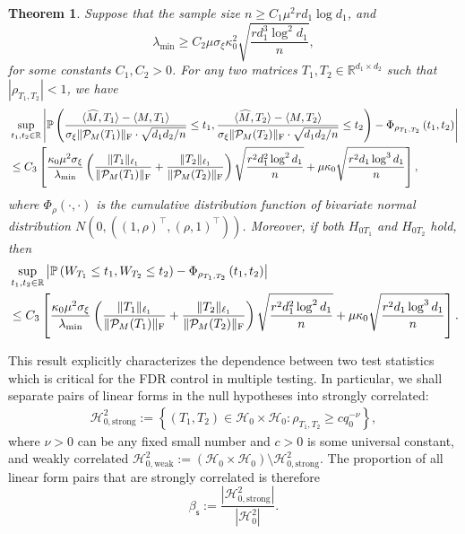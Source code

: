 \documentclass[12pt]{article}
\newcommand{\tF}{{\rm F}}
\newcommand{\abs}[1]{\left\lvert#1\right\rvert}
\newcommand{\R}{\mathbb{R}}
\newcommand{\cH}{\mathcal{H}}
\newcommand{\cP}{\mathcal{P}}
\def\calH{{\mathcal H}}
\newtheorem{Theorem}{Theorem}
\theoremstyle{plain}
\begin{document}
\begin{sloppypar}
\begin{Theorem}\label{thm:asymp-two-var} 
	Suppose that the sample size $n \geq C_1 \mu^2 r d_1 \log d_1$, and
	$$
	\lambda_{\min}\geq C_2 \mu \sigma_{\xi}\kappa_0^2  \sqrt{\frac{r  d_1^3 \log ^2 d_1}{n}},
	$$
	for some constants $C_1,C_2>0$. For any two matrices $T_1, T_2\in \R^{d_1\times d_2}$ such that $|\rho_{T_1,T_2}|<1$, we have
	\begin{equation*}
		\begin{aligned}
			&\sup _{t_1,t_2 \in \mathbb{R}}\left|\mathbb{P}\left(\frac{\langle \widehat{M}, T_1\rangle-\langle M, T_1\rangle}{\sigma_{\xi}\|\cP_M(T_1) \|_\tF \cdot \sqrt{d_1 d_2 / n}} \leq t_1, \frac{\langle \widehat{M}, T_2\rangle-\langle M, T_2\rangle}{\sigma_{\xi}\|\cP_M(T_2) \|_\tF \cdot \sqrt{d_1 d_2 / n}} \leq t_2\right)-\Phi_{
				\rho_{T_1,T_2}}\left(t_1,t_2\right)\right|   \\
			& \le C_3\left[\frac{\kappa_0 \mu^2\sigma_{\xi}}{\lambda_{\min}} \left({\|T_1\|_{\ell_1}\over \|\cP_M(T_1)\|_{\rm F}}+{\|T_2\|_{\ell_1}\over \|\cP_M(T_2)\|_{\rm F}}\right)\sqrt{\frac{r^2 d_1^2 \log ^2 d_1}{n}}+ \mu \kappa_0 \sqrt{\frac{r^2 d_1 \log ^3 d_1}{n}} \right],
		\end{aligned}
	\end{equation*}
	where $\Phi_\rho(\cdot,\cdot)$ is the cumulative distribution function of bivariate normal distribution $N(0,((1, \rho)^\top, (\rho, 1)^\top))$. Moreover, if both $H_{0T_1}$ and $H_{0T_2}$ hold, then
	\begin{equation*}
		\begin{aligned}
			&\sup _{t_1,t_2 \in \mathbb{R}}\left|\mathbb{P}\left(W_{T_1} \leq t_1, W_{T_2} \leq t_2\right)-\Phi_{
				\rho_{T_1,T_2}}\left(t_1,t_2\right)\right|   \\
			& \le C_3\left[\frac{\kappa_0 \mu^2\sigma_{\xi}}{\lambda_{\min}} \left({\|T_1\|_{\ell_1}\over \|\cP_M(T_1)\|_{\rm F}}+{\|T_2\|_{\ell_1}\over \|\cP_M(T_2)\|_{\rm F}}\right)\sqrt{\frac{r^2 d_1^2 \log ^2 d_1}{n}}+ \mu \kappa_0 \sqrt{\frac{r^2 d_1 \log ^3 d_1}{n}} \right].
		\end{aligned}
	\end{equation*}
\end{Theorem}

This result explicitly characterizes the dependence between two test statistics which is critical for the FDR control in multiple testing. In particular, we shall separate pairs of linear forms in the null hypotheses into strongly correlated:
\begin{equation}\label{eq:weak-corr-1}
	\begin{aligned}
		\cH_{0,\text{strong} }^2 := \left\{ (T_1,T_2)\in\cH_0\times \cH_0 : \rho_{T_1,T_2}\ge c q_0^{-\nu} \right\},
	\end{aligned}
\end{equation}
where $\nu>0$ can be any fixed small number and $c>0$ is some universal constant, and weakly correlated $\cH_{0,\text{weak} }^2:=(\calH_0\times \calH_0)\setminus \cH_{0,\text{strong} }^2$. The proportion of  all linear form pairs that are strongly correlated is therefore
$$\beta_{\mathsf{s} } := \frac{ \abs{ \cH_{0,\text{strong} }^2 }   }{\abs{ \cH_{0}^2 }}.$$


\end{sloppypar}
\end{document}
